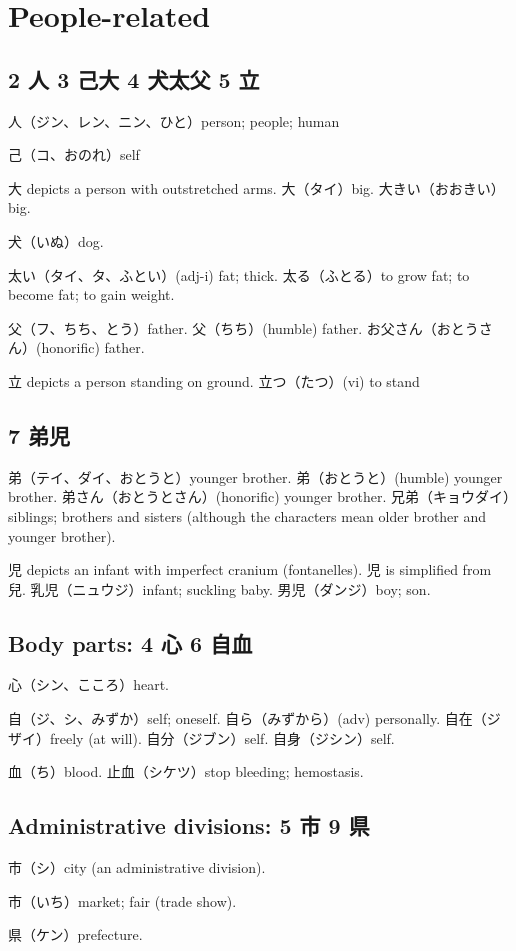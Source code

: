 \section{People-related}

\subsection{2 人 3 己大 4 犬太父 5 立}

人（ジン、レン、ニン、ひと）person; people; human

己（コ、おのれ）self

大 depicts a person with outstretched arms.
大（タイ）big.
大きい（おおきい）big.

犬（いぬ）dog.

太い（タイ、タ、ふとい）(adj-i) fat; thick.
太る（ふとる）to grow fat; to become fat; to gain weight.

父（フ、ちち、とう）father.
父（ちち）(humble) father.
お父さん（おとうさん）(honorific) father.

立 depicts a person standing on ground.
立つ（たつ）(vi) to stand

\subsection{7 弟児}

弟（テイ、ダイ、おとうと）younger brother.
弟（おとうと）(humble) younger brother.
弟さん（おとうとさん）(honorific) younger brother.
兄弟（キョウダイ）siblings;
brothers and sisters
(although the characters mean older brother and younger brother).

児 depicts an infant with imperfect cranium (fontanelles).
児 is simplified from 兒.
乳児（ニュウジ）infant; suckling baby.
男児（ダンジ）boy; son.

\subsection{Body parts: 4 心 6 自血}

心（シン、こころ）heart.

自（ジ、シ、みずか）self; oneself.
自ら（みずから）(adv) personally.
自在（ジザイ）freely (at will).
自分（ジブン）self.
自身（ジシン）self.

血（ち）blood.
止血（シケツ）stop bleeding; hemostasis.

\subsection{Administrative divisions: 5 市 9 県}


市（シ）city (an administrative division).

市（いち）market; fair (trade show).

県（ケン）prefecture.
